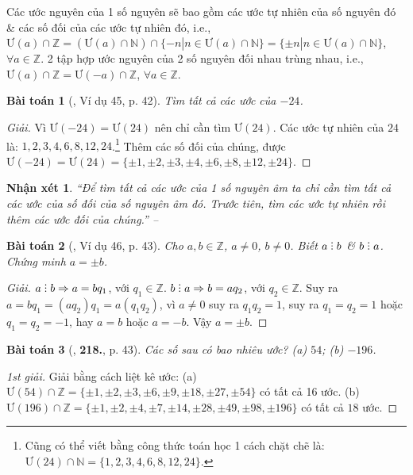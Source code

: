 \documentclass{article}
\numberwithin{equation}{section}
\newtheorem{baitoan}{Bài toán}
\newtheorem{nhanxet}{Nhận xét}[section]
\DeclareRobustCommand{\divby}{%
	\mathrel{\vbox{\baselineskip.65ex\lineskiplimit0pt\hbox{.}\hbox{.}\hbox{.}}}%
}
\begin{document}
Các ước nguyên của 1 số nguyên sẽ bao gồm các ước tự nhiên của số nguyên đó \& các số đối của các ước tự nhiên đó, i.e., $\mbox{Ư}(a)\cap\mathbb{Z} = (\mbox{Ư}(a)\cap\mathbb{N})\cap\{-n|n\in\mbox{Ư}(a)\cap\mathbb{N}\} = \{\pm n|n\in\mbox{Ư}(a)\cap\mathbb{N}\}$, $\forall a\in\mathbb{Z}$. 2 tập hợp ước nguyên của 2 số nguyên đối nhau trùng nhau, i.e., $\mbox{Ư}(a)\cap\mathbb{Z} = \mbox{Ư}(-a)\cap\mathbb{Z}$, $\forall a\in\mathbb{Z}$.

\begin{baitoan}[\cite{Tuyen_Toan_6}, Ví dụ 45, p. 42]
	Tìm tất cả các ước của $-24$.
\end{baitoan}

\begin{proof}[Giải]
	Vì $\mbox{Ư}(-24) = \mbox{Ư}(24)$ nên chỉ cần tìm $\mbox{Ư}(24)$. Các ước tự nhiên của $24$ là: $1,2,3,4,6,8,12,24$.\footnote{Cũng có thể viết bằng công thức toán học 1 cách chặt chẽ là: $\mbox{Ư}(24)\cap\mathbb{N} = \{1,2,3,4,6,8,12,24\}$.} Thêm các số đối của chúng, được $\mbox{Ư}(-24) = \mbox{Ư}(24) = \{\pm1,\pm2,\pm3,\pm4,\pm6,\pm8,\pm12,\pm24\}$.
\end{proof}

\begin{nhanxet}
	``Để tìm tất cả các ước của 1 số nguyên âm ta chỉ cần tìm tất cả các ước của số đối của số nguyên âm đó. Trước tiên, tìm các ước tự nhiên rồi thêm các ước đối của chúng.'' -- \cite[p. 42]{Tuyen_Toan_6}
\end{nhanxet}

\begin{baitoan}[\cite{Tuyen_Toan_6}, Ví dụ 46, p. 43]
	Cho $a,b\in\mathbb{Z}$, $a\ne0$, $b\ne0$. Biết $a\divby b$ \& $b\divby a$. Chứng minh $a = \pm b$.
\end{baitoan}

\begin{proof}[Giải]
	$a\divby b\Rightarrow a = bq_1$, với $q_1\in\mathbb{Z}$. $b\divby a\Rightarrow b = aq_2$, với $q_2\in\mathbb{Z}$. Suy ra $a = bq_1 = (aq_2)q_1 = a(q_1q_2)$, vì $a\ne0$ suy ra $q_1q_2 = 1$, suy ra $q_1 = q_2 = 1$ hoặc $q_1 = q_2 = -1$, hay $a = b$ hoặc $a = -b$. Vậy $a = \pm b$.
\end{proof}

\begin{baitoan}[\cite{Tuyen_Toan_6}, \textbf{218.}, p. 43]
	Các số sau có bao nhiêu ước? (a) $54$; (b) $-196$.
\end{baitoan}

\begin{proof}[1st giải]
	Giải bằng cách liệt kê ước: (a) $\mbox{Ư}(54)\cap\mathbb{Z} = \{\pm1,\pm2,\pm3,\pm6,\pm9,\pm18,\pm27,\pm54\}$ có tất cả 16 ước. (b) $\mbox{Ư}(196)\cap\mathbb{Z} = \{\pm1,\pm2,\pm4,\pm7,\pm14,\pm28,\pm49,\pm98,\pm196\}$ có tất cả $18$ ước.
\end{proof}
\end{document}
